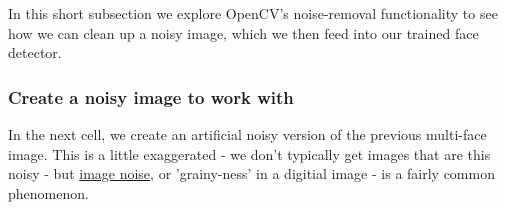 \documentclass[11pt]{article}
\begin{document}
In this short subsection we explore OpenCV's noise-removal functionality
to see how we can clean up a noisy image, which we then feed into our
trained face detector.

    \subsubsection{Create a noisy image to work
with}\label{create-a-noisy-image-to-work-with}

In the next cell, we create an artificial noisy version of the previous
multi-face image. This is a little exaggerated - we don't typically get
images that are this noisy - but
\href{https://digital-photography-school.com/how-to-avoid-and-reduce-noise-in-your-images/}{image
noise}, or 'grainy-ness' in a digitial image - is a fairly common
phenomenon.
\end{document}
